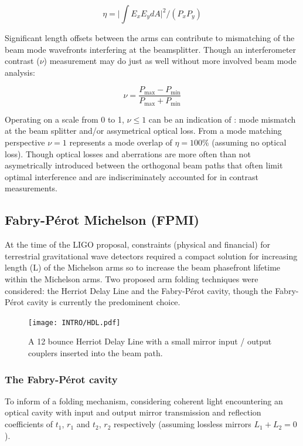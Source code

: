 \begin{equation}\label{eq:modeoverlap}
	\eta = \bigg|\int E_x E_y dA \bigg|^{2} \bigg/ (P_x P_y) 
\end{equation}

Significant length offsets between the arms can contribute to mismatching of the beam mode wavefronts interfering at the beamsplitter. Though an interferometer contrast ($\nu$) measurement may do just as well without more involved beam mode analysis:

\begin{equation}\label{eq:contrast}
	\nu = \frac{P_\mathrm{max} - P_\mathrm{min}}{P_\mathrm{max} + P_\mathrm{min}}
\end{equation}

Operating on a scale from 0 to 1, $\nu \le 1$ can be an indication of : mode mismatch at the beam splitter and/or assymetrical optical loss. From a mode matching perspective $\nu = 1$ represents a mode overlap of $\eta = 100 \%$ (assuming no optical loss).  Though optical losses and aberrations are more often than not asymetrically introduced between the orthogonal beam paths that often limit optimal interference and are indiscriminately accounted for in contrast measurements.  

\subsection{Fabry-P\'{e}rot Michelson (FPMI)}
At the time of the LIGO proposal, constraints (physical and financial) for terrestrial gravitational wave detectors required a compact solution for increasing length (L) of the Michelson arms so to increase the beam phasefront lifetime within the Michelson arms. Two proposed arm folding techniques were considered: the Herriot Delay Line and the Fabry-P\'{e}rot cavity, though the Fabry-P\'{e}rot cavity is currently the predominent choice.

\begin{figure}[ht!]
	\centering
	\texttt{[image: INTRO/HDL.pdf]}
	\caption{A 12 bounce Herriot Delay Line with a small mirror input / output couplers inserted into the beam path.}
	\label{fig:hdlcav}
\end{figure}

\subsubsection{The Fabry-P\'{e}rot cavity}
\label{sec:FPC}
To inform of a folding mechanism, considering coherent light encountering an optical cavity with input and output mirror transmission and reflection coefficients of $t_1$, $r_1$ and $t_2$, $r_2$ respectively (assuming lossless mirrors $L_1 + L_2=0$).

